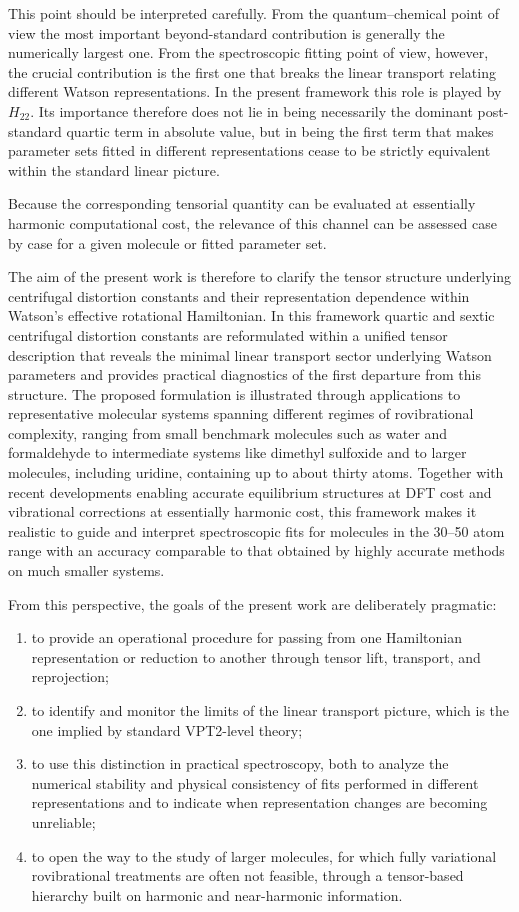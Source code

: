 \documentclass[aip,jcp,reprint,floatfix]{revtex4-2}
\begin{document}
This point should be interpreted carefully.
From the quantum--chemical point of view the most important
beyond-standard contribution is generally the numerically largest one.
From the spectroscopic fitting point of view, however, the crucial
contribution is the first one that breaks the linear transport relating
different Watson representations.
In the present framework this role is played by $H_{22}$.
Its importance therefore does not lie in being necessarily the dominant
post-standard quartic term in absolute value, but in being the first
term that makes parameter sets fitted in different representations cease
to be strictly equivalent within the standard linear picture.

Because the corresponding tensorial quantity can be evaluated at
essentially harmonic computational cost, the relevance of this channel
can be assessed case by case for a given molecule or fitted parameter
set.

The aim of the present work is therefore to clarify the tensor structure
underlying centrifugal distortion constants and their representation
dependence within Watson's effective rotational Hamiltonian. In this
framework quartic and sextic centrifugal distortion constants are
reformulated within a unified tensor description that reveals the
minimal linear transport sector underlying Watson parameters and
provides practical diagnostics of the first departure from this
structure. The proposed formulation is illustrated through applications
to representative molecular systems spanning different regimes of
rovibrational complexity, ranging from small benchmark molecules such
as water and formaldehyde to intermediate systems like dimethyl
sulfoxide and to larger molecules, including uridine, containing up to
about thirty atoms. Together with recent developments enabling accurate
equilibrium structures at DFT cost and vibrational corrections at
essentially harmonic cost, this framework makes it realistic to guide
and interpret spectroscopic fits for molecules in the 30--50 atom range
with an accuracy comparable to that obtained by highly accurate methods
on much smaller systems.

From this perspective, the goals of the present work are deliberately
pragmatic:
\begin{enumerate}
\item to provide an operational procedure for passing from one
Hamiltonian representation or reduction to another through tensor lift,
transport, and reprojection;
\item to identify and monitor the limits of the linear transport picture,
which is the one implied by standard VPT2-level theory;
\item to use this distinction in practical spectroscopy, both to analyze
the numerical stability and physical consistency of fits performed in
different representations and to indicate when representation changes are
becoming unreliable;
\item to open the way to the study of larger molecules, for which fully
variational rovibrational treatments are often not feasible, through a
tensor-based hierarchy built on harmonic and near-harmonic information.
\end{enumerate}
\end{document}
